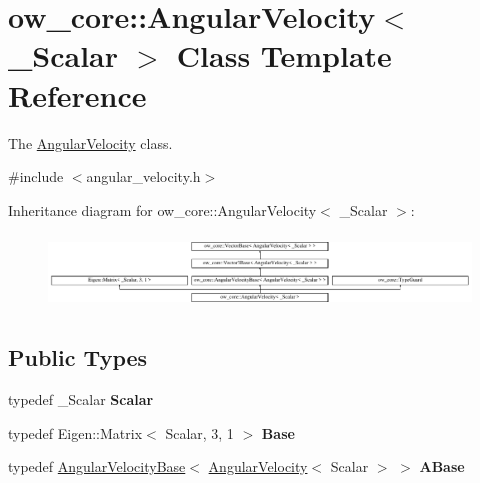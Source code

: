 \hypertarget{classow__core_1_1AngularVelocity}{}\section{ow\+\_\+core\+:\+:Angular\+Velocity$<$ \+\_\+\+Scalar $>$ Class Template Reference}
\label{classow__core_1_1AngularVelocity}


The \hyperlink{classow__core_1_1AngularVelocity}{Angular\+Velocity} class.  




{\ttfamily \#include $<$angular\+\_\+velocity.\+h$>$}

Inheritance diagram for ow\+\_\+core\+:\+:Angular\+Velocity$<$ \+\_\+\+Scalar $>$\+:\begin{figure}[H]
\begin{center}
\leavevmode
\includegraphics[height=1.980548cm]{d2/da5/classow__core_1_1AngularVelocity}
\end{center}
\end{figure}
\subsection*{Public Types}
\begin{DoxyCompactItemize}
\item 
typedef \+\_\+\+Scalar {\bfseries Scalar}\hypertarget{classow__core_1_1AngularVelocity_ae9c8b95a9177664cf39bd57d667a0fce}{}\label{classow__core_1_1AngularVelocity_ae9c8b95a9177664cf39bd57d667a0fce}

\item 
typedef Eigen\+::\+Matrix$<$ Scalar, 3, 1 $>$ {\bfseries Base}\hypertarget{classow__core_1_1AngularVelocity_a1c23fcb87f5e50b5d93eb07f4ff1efa2}{}\label{classow__core_1_1AngularVelocity_a1c23fcb87f5e50b5d93eb07f4ff1efa2}

\item 
typedef \hyperlink{classow__core_1_1AngularVelocityBase}{Angular\+Velocity\+Base}$<$ \hyperlink{classow__core_1_1AngularVelocity}{Angular\+Velocity}$<$ Scalar $>$ $>$ {\bfseries A\+Base}\hypertarget{classow__core_1_1AngularVelocity_a8136c8330345dd04900483af45b0e360}{}\label{classow__core_1_1AngularVelocity_a8136c8330345dd04900483af45b0e360}

\end{DoxyCompactItemize}
